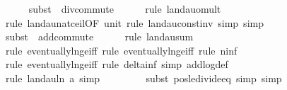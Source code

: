 \begin{isabellebody}
\ \ \ \ \isamarkupfalse%
\ {\isacharparenleft}{\kern0pt}subst\ {\isacharparenleft}{\kern0pt}{}{\isacharparenright}{\kern0pt}\ div{\isacharunderscore}{\kern0pt}commute{\isacharparenright}{\kern0pt}\isanewline
\ \ \ \ \isamarkupfalse%
\ {\isacharparenleft}{\kern0pt}rule\ landau{\isacharunderscore}{\kern0pt}o{\isachardot}{\kern0pt}mult{\isacharparenright}{\kern0pt}\isanewline
\ \ \ \ \ \isamarkupfalse%
\ {\isacharparenleft}{\kern0pt}rule\ landau{\isacharunderscore}{\kern0pt}nat{\isacharunderscore}{\kern0pt}ceil{\isacharbrackleft}{\kern0pt}OF\ unit{\isacharunderscore}{\kern0pt}{}{\isacharbrackright}{\kern0pt}{\isacharcomma}{\kern0pt}\ rule\ landau{\isacharunderscore}{\kern0pt}const{\isacharunderscore}{\kern0pt}inv{\isacharcomma}{\kern0pt}\ simp{\isacharcomma}{\kern0pt}\ simp{\isacharparenright}{\kern0pt}\isanewline
\ \ \ \ \isamarkupfalse%
\ {\isacharparenleft}{\kern0pt}subst\ {\isacharparenleft}{\kern0pt}{}{\isacharparenright}{\kern0pt}\ add{\isachardot}{\kern0pt}commute{\isacharparenright}{\kern0pt}\isanewline
\ \ \ \ \isamarkupfalse%
\ {\isacharparenleft}{\kern0pt}rule\ landau{\isacharunderscore}{\kern0pt}sum{\isacharparenright}{\kern0pt}\isanewline
\ \ \ \ \ \ \ \isamarkupfalse%
\ {\isacharparenleft}{\kern0pt}rule\ eventually{\isacharunderscore}{\kern0pt}ln{\isacharunderscore}{\kern0pt}ge{\isacharunderscore}{\kern0pt}iff{\isacharcomma}{\kern0pt}\ rule\ eventually{\isacharunderscore}{\kern0pt}ln{\isacharunderscore}{\kern0pt}ge{\isacharunderscore}{\kern0pt}iff{\isacharcomma}{\kern0pt}\ rule\ n{\isacharunderscore}{\kern0pt}inf{\isacharparenright}{\kern0pt}\isanewline
\ \ \ \ \ \ \isamarkupfalse%
\ {\isacharparenleft}{\kern0pt}rule\ eventually{\isacharunderscore}{\kern0pt}ln{\isacharunderscore}{\kern0pt}ge{\isacharunderscore}{\kern0pt}iff{\isacharcomma}{\kern0pt}\ rule\ delta{\isacharunderscore}{\kern0pt}inf{\isacharcomma}{\kern0pt}\ simp\ add{\isacharcolon}{\kern0pt}log{\isacharunderscore}{\kern0pt}def{\isacharparenright}{\kern0pt}\isanewline
\ \ \ \ \ \isamarkupfalse%
\ {\isacharparenleft}{\kern0pt}rule\ landau{\isacharunderscore}{\kern0pt}ln{\isacharunderscore}{\kern0pt}{}{\isacharbrackleft}{\kern0pt}\ a{\isacharequal}{\kern0pt}{\isachardoublequoteopen}{}{\isachardoublequoteclose}{\isacharbrackright}{\kern0pt}{\isacharcomma}{\kern0pt}\ simp{\isacharparenright}{\kern0pt}\isanewline
\ \ \ \ \ \ \ \isamarkupfalse%
\ {\isacharparenleft}{\kern0pt}subst\ pos{\isacharunderscore}{\kern0pt}le{\isacharunderscore}{\kern0pt}divide{\isacharunderscore}{\kern0pt}eq{\isacharcomma}{\kern0pt}\ simp{\isacharcomma}{\kern0pt}\ simp{\isacharparenright}{\kern0pt}\isanewline

\end{isabellebody}
